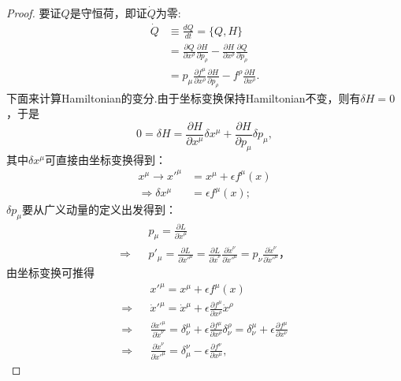 		\begin{proof}
		要证$Q$是守恒荷，即证$\dot{Q}$为零:
		\begin{equation*}
			\begin{split}
				\dot{Q}&\equiv\frac{dQ}{dt}=\{Q,H\}\\
				&=\frac{\partial Q}{\partial x^\rho}\frac{\partial H}{\partial p_\rho}-\frac{\partial H}{\partial x^\rho}\frac{\partial Q}{\partial p_\rho}\\
				&=p_\mu \frac{\partial f^\mu}{\partial x^\rho}\frac{\partial H}{\partial p_\rho}-f^\rho\frac{\partial H}{\partial x^\rho}.
			\end{split}
		\end{equation*}
		下面来计算Hamiltonian的变分.由于坐标变换保持Hamiltonian不变，则有$\delta H=0$，于是
		\begin{equation}\label{pr:delta H}
			0=\delta H=\frac{\partial H}{\partial x^\mu}\delta x^\mu+\frac{\partial H}{\partial p_\mu}\delta p_\mu,
		\end{equation}
		其中$\delta x^\mu$可直接由坐标变换得到：
		\begin{equation}\label{pr:delta x}
			\begin{split}
				x^\mu\rightarrow x'^\mu&=x^\mu+\epsilon f^\mu(x)\\
				\Rightarrow\delta x^\mu&=\epsilon f^\mu(x);
			\end{split}
		\end{equation}
		$\delta p_\mu$要从广义动量的定义出发得到：
		\begin{eqnarray*}
			&&p_\mu=\frac{\partial L}{\partial \dot{x}^\mu}\\
			\Rightarrow &&p'_\mu=\frac{\partial L}{\partial \dot{x}'^\mu}=\frac{\partial L}{\partial \dot{x}^\nu}\frac{\partial \dot{x}^\nu}{\partial \dot{x}'^\mu}=p_\nu\frac{\partial \dot{x}^\nu}{\partial \dot{x}'^\mu}，
		\end{eqnarray*}
		由坐标变换可推得
		\begin{eqnarray*}
			&&x'^\mu=x^\mu+\epsilon f^\mu(x)\\
			\Rightarrow&&\dot{x}'^\mu=\dot{x}^\mu+\epsilon \frac{\partial f^\mu}{\partial x^\rho}\dot{x}^\rho\\
			\Rightarrow&&\frac{\partial \dot{x}'^\mu}{\partial \dot{x}^\nu}=\delta^\mu_\nu+\epsilon \frac{\partial f^\mu}{\partial x^\rho}\delta^\rho_\nu=\delta^\mu_\nu+\epsilon \frac{\partial f^\mu}{\partial x^\nu}\\
			\Rightarrow&&\frac{\partial \dot{x}^\nu}{\partial \dot{x}'^\mu}=\delta^\nu_\mu-\epsilon \frac{\partial f^\nu}{\partial x^\mu},

\end{eqnarray*}
\end{proof}
